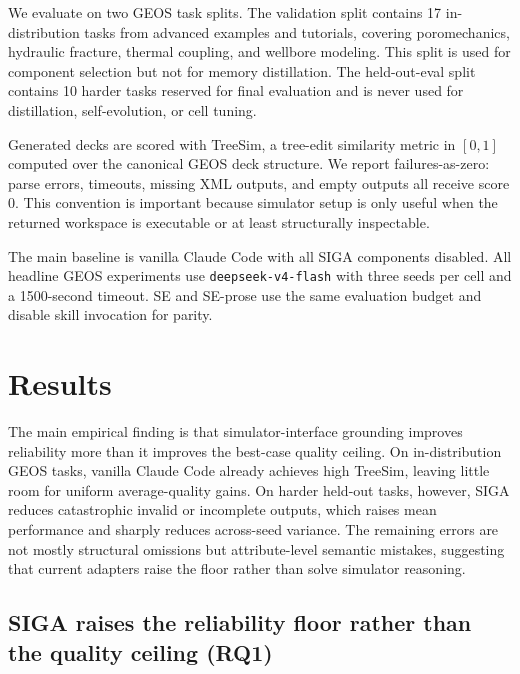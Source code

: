 \documentclass{article}
\begin{document}
We evaluate on two GEOS task splits. The validation split contains 17 in-distribution tasks from advanced examples 
and tutorials, covering poromechanics, hydraulic fracture, thermal coupling, and wellbore modeling. This split is used 
for component selection but not for memory distillation. The held-out-eval split contains 10 harder tasks reserved 
for final evaluation and is never used for distillation, self-evolution, or cell tuning.

Generated decks are scored with TreeSim, a tree-edit similarity metric in $[0,1]$ computed over the canonical GEOS 
deck structure. We report failures-as-zero: parse errors, timeouts, missing XML outputs, and empty outputs all receive 
score 0. This convention is important because simulator setup is only useful when the returned workspace is executable 
or at least structurally inspectable.

The main baseline is vanilla Claude Code with all SIGA components disabled. All headline GEOS experiments use 
\texttt{deepseek-v4-flash} with three seeds per cell and a 1500-second timeout. SE and SE-prose use the same evaluation budget 
and disable skill invocation for parity.



\section{Results}
\label{sec:results}

The main empirical finding is that simulator-interface grounding improves reliability more than it improves the 
best-case quality ceiling. On in-distribution GEOS tasks, vanilla Claude Code already achieves high TreeSim, leaving 
little room for uniform average-quality gains. On harder held-out tasks, however, SIGA reduces catastrophic invalid or 
incomplete outputs, which raises mean performance and sharply reduces across-seed variance. The remaining errors are 
not mostly structural omissions but attribute-level semantic mistakes, suggesting that current adapters raise the floor 
rather than solve simulator reasoning.

\subsection{SIGA raises the reliability floor rather than the quality ceiling (RQ1)}
\label{subsec:quality}
\end{document}
